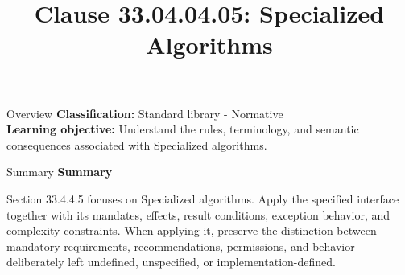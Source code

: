 \documentclass[10pt,letterpaper]{article}
\title{Clause 33.04.04.05: Specialized Algorithms}
\author{}
\date{}
\begin{document}
\maketitle
\begin{CornellOverviewBox}{Overview}
\textbf{Classification:} Standard library - Normative\\[2pt]
\textbf{Learning objective:} Understand the rules, terminology, and semantic consequences associated with Specialized algorithms.
\end{CornellOverviewBox}\begin{CornellSummaryBox}{Summary}
{\sffamily\bfseries\color{Accent} Summary}\par\vspace{3pt}Section 33.4.4.5 focuses on Specialized algorithms. Apply the specified interface together with its mandates, effects, result conditions, exception behavior, and complexity constraints. When applying it, preserve the distinction between mandatory requirements, recommendations, permissions, and behavior deliberately left undefined, unspecified, or implementation-defined.
\end{CornellSummaryBox}
\end{document}
